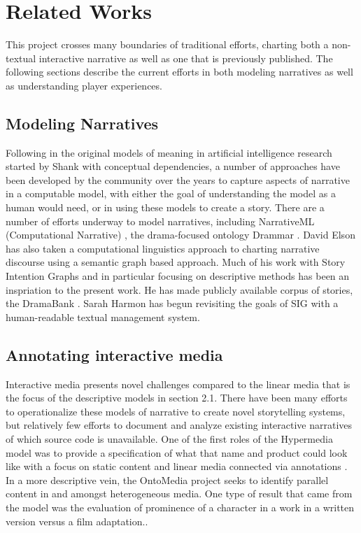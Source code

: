 \section{Related Works}
\label{sec:orgheadline11}
This project crosses many boundaries of traditional efforts, charting
both a non-textual interactive narrative as well as one that is
previously published. The following sections describe the current
efforts in both modeling narratives as well as understanding player
experiences.

\subsection{Modeling Narratives}
\label{sec:orgheadline3}
Following in the original models of meaning in artificial intelligence
research started by Shank with conceptual dependencies, a number of
approaches have been developed by the community over the years to
capture aspects of narrative in a computable model, with either the
goal of understanding the model as a human would need, or in using
these models to create a story. There are a number of efforts underway
to model narratives, including NarrativeML (Computational Narrative)
\cite{Mani2012-py}, the drama-focused ontology Drammar
\cite{Albert2016-ij,Larsen2016-sk,Rapp2001-ea}. David Elson has also
taken a computational linguistics approach to charting narrative
discourse using a semantic graph based approach. Much of his work with
Story Intention Graphs \cite{Elson2012-pi} and in particular focusing
on descriptive methods has been an inspriation to the present work. He
has made publicly available corpus of stories, the DramaBank
\cite{Elson2012-xn}. Sarah Harmon has begun revisiting the goals of
SIG with a human-readable textual management system.

\subsection{Annotating interactive media}
\label{sec:orgheadline4}
Interactive media presents novel challenges compared to the linear
media that is the focus of the descriptive models in section
2.1. There have been many efforts to operationalize these models of
narrative to create novel storytelling systems, but relatively few
efforts to document and analyze existing interactive narratives of
which source code is unavailable. One of the first roles of the
Hypermedia model was to provide a specification of what that name and
product could look like with a focus on static content and linear
media connected via annotations \cite{Hardman1994-xs}. In a more
descriptive vein, the OntoMedia project \cite{Jewell2005-ya} seeks to
identify parallel content in and amongst heterogeneous media. One type
of result that came from the model was the evaluation of prominence of
a character in a work in a written version versus a film adaptation..

